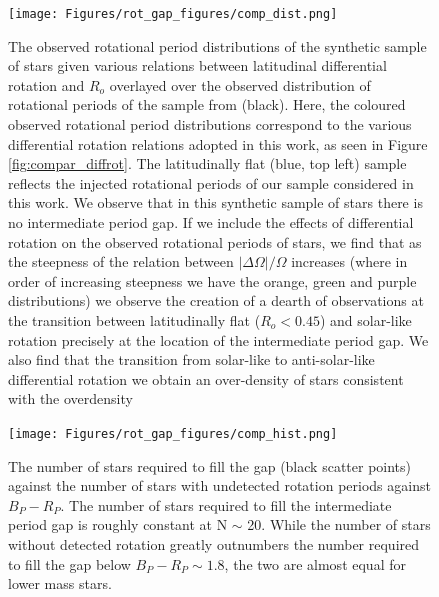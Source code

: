 \begin{figure}
\centering
    \texttt{[image: Figures/rot\_gap\_figures/comp\_dist.png]}
    \caption{
    	The observed rotational period distributions of the synthetic sample of stars given various relations between latitudinal differential rotation and $R_o$ overlayed over the observed distribution of rotational periods of the \kepler{} sample from \citet{mcquillan_2014} (black). Here, the coloured observed rotational period distributions correspond to the various differential rotation relations adopted in this work, as seen in Figure \ref{fig:compar_diffrot}. The latitudinally flat (blue, top left) sample reflects the injected rotational periods of our sample considered in this work. We observe that in this synthetic sample of stars there is no intermediate period gap. If we include the effects of differential rotation on the observed rotational periods of stars, we find that as the steepness of the relation between $|\Delta \Omega|/\Omega$ increases (where in order of increasing steepness we have the orange, green and purple distributions) we observe the creation of a dearth of observations at the transition between latitudinally flat ($R_o<0.45$) and solar-like rotation precisely at the location of the intermediate period gap. We also find that the transition from solar-like to anti-solar-like differential rotation we obtain an over-density of stars consistent with the overdensity
}
    \label{fig:comp_dist}
\end{figure}

\begin{figure}
\centering
    \texttt{[image: Figures/rot\_gap\_figures/comp\_hist.png]}
    \caption{
    	The number of stars required to fill the gap (black scatter points) against the number of stars with undetected rotation periods against $B_P-R_P$. The number of stars required to fill the intermediate period gap is roughly constant at N $\sim$ 20. While the number of stars without detected rotation greatly outnumbers the number required to fill the gap below $B_P-R_P \sim 1.8$, the two are almost equal for lower mass stars.
}
    \label{fig:comp_hist}
\end{figure}




